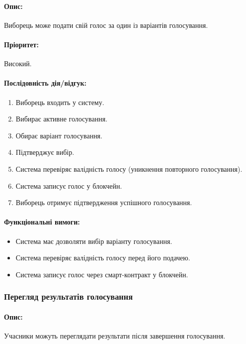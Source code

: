 \documentclass[14pt]{extreport}
\newcounter{req}[subsubsection]
\newcommand\req{\arabic{req}\stepcounter{req}}
\begin{document}
  \paragraph{Опис:} Виборець може подати свій голос за один із варіантів голосування.  
  \paragraph{Пріоритет:} Високий.  
  \paragraph{Послідовність дія/відгук:}  
  \begin{enumerate}  
      \item Виборець входить у систему.  
      \item Вибирає активне голосування.  
      \item Обирає варіант голосування.  
      \item Підтверджує вибір.  
      \item Система перевіряє валідність голосу (уникнення повторного голосування).  
      \item Система записує голос у блокчейн.  
      \item Виборець отримує підтвердження успішного голосування.  
  \end{enumerate}  
  \paragraph{Функціональні вимоги:}  
  \begin{itemize}[leftmargin=*,label=REQ-.\req:]  
      \item Система має дозволяти вибір варіанту голосування.  
      \item Система перевіряє валідність голосу перед його подачею.  
      \item Система записує голос через смарт-контракт у блокчейн.  
  \end{itemize}  

  \subsubsection{Перегляд результатів голосування}  
  \paragraph{Опис:} Учасники можуть переглядати результати після завершення голосування.  
\end{document}
